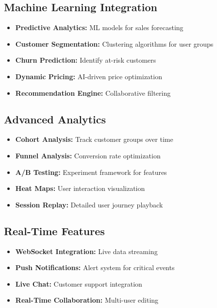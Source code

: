 \documentclass[12pt,a4paper]{article}
\begin{document}
\subsection{Machine Learning Integration}

\begin{itemize}[leftmargin=*]
    \item \textbf{Predictive Analytics:} ML models for sales forecasting
    \item \textbf{Customer Segmentation:} Clustering algorithms for user groups
    \item \textbf{Churn Prediction:} Identify at-risk customers
    \item \textbf{Dynamic Pricing:} AI-driven price optimization
    \item \textbf{Recommendation Engine:} Collaborative filtering
\end{itemize}

\subsection{Advanced Analytics}

\begin{itemize}[leftmargin=*]
    \item \textbf{Cohort Analysis:} Track customer groups over time
    \item \textbf{Funnel Analysis:} Conversion rate optimization
    \item \textbf{A/B Testing:} Experiment framework for features
    \item \textbf{Heat Maps:} User interaction visualization
    \item \textbf{Session Replay:} Detailed user journey playback
\end{itemize}

\subsection{Real-Time Features}

\begin{itemize}[leftmargin=*]
    \item \textbf{WebSocket Integration:} Live data streaming
    \item \textbf{Push Notifications:} Alert system for critical events
    \item \textbf{Live Chat:} Customer support integration
    \item \textbf{Real-Time Collaboration:} Multi-user editing
\end{itemize}
\end{document}
